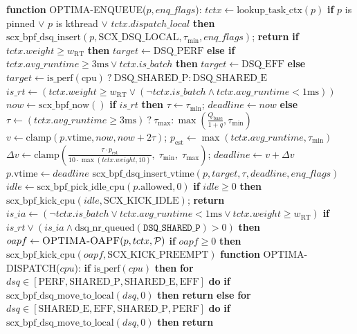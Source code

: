 \documentclass[conference]{IEEEtran}
\begin{document}
\begin{algorithm}[t]
\caption{OPTIMA-ENQUEUE \& OPTIMA-DISPATCH}
\label{alg:enqueue}\label{alg:dispatch}
\begin{algorithmic}[1]
\scriptsize\setlength{\itemsep}{0pt}
\STATE \textbf{function} \textsc{OPTIMA-ENQUEUE}($p, enq\_flags$):
\STATE \quad $tctx \leftarrow \text{lookup\_task\_ctx}(p)$
\STATE \quad \textbf{if} $p$ is pinned $\lor$ $p$ is kthread $\lor$ $tctx.dispatch\_local$ \textbf{then}
\STATE \quad \quad $\text{scx\_bpf\_dsq\_insert}(p, \text{SCX\_DSQ\_LOCAL}, \tau_{\min}, enq\_flags)$; \textbf{return}
\STATE \quad \textbf{if} $tctx.weight \ge w_{\mathrm{RT}}$ \textbf{then} $target \leftarrow \text{DSQ\_PERF}$
\STATE \quad \textbf{else if} $tctx.avg\_runtime \ge 3\text{ms} \lor tctx.is\_batch$ \textbf{then} $target \leftarrow \text{DSQ\_EFF}$
\STATE \quad \textbf{else} $target \leftarrow \text{is\_perf}(\text{cpu}) \ ? \ \text{DSQ\_SHARED\_P} : \text{DSQ\_SHARED\_E}$
\STATE \quad $is\_rt \leftarrow (tctx.weight \ge w_{\mathrm{RT}} \lor (\neg tctx.is\_batch \land tctx.avg\_runtime < 1\text{ms}))$
\STATE \quad $now \leftarrow \text{scx\_bpf\_now}()$
\STATE \quad \textbf{if} $is\_rt$ \textbf{then} $\tau \leftarrow \tau_{\min}$; $deadline \leftarrow now$
\STATE \quad \textbf{else}
\STATE \quad \quad $\tau \leftarrow (tctx.avg\_runtime \ge 3\text{ms}) \ ? \ \tau_{\max} : \max(\frac{Q_{\text{base}}}{1+q}, \tau_{\min})$
\STATE \quad \quad $v \leftarrow \mathrm{clamp}(p.\text{vtime}, now, now + 2\tau)$; $p_{\mathrm{est}} \leftarrow \max(tctx.avg\_runtime, \tau_{\min})$
\STATE \quad \quad $\Delta v \leftarrow \mathrm{clamp}\left( \frac{\tau \cdot p_{\mathrm{est}}}{10 \cdot \max(tctx.weight, 10)}, \; \tau_{\min}, \; \tau_{\max} \right)$; $deadline \leftarrow v + \Delta v$
\STATE \quad $p.\text{vtime} \leftarrow deadline$
\STATE \quad $\text{scx\_bpf\_dsq\_insert\_vtime}(p, target, \tau, deadline, enq\_flags)$
\STATE \quad $idle \leftarrow \text{scx\_bpf\_pick\_idle\_cpu}(p.\text{allowed}, 0)$
\STATE \quad \textbf{if} $idle \ge 0$ \textbf{then} $\text{scx\_bpf\_kick\_cpu}(idle, \text{SCX\_KICK\_IDLE})$; \textbf{return}
\STATE \quad $is\_ia \leftarrow (\neg tctx.is\_batch \lor tctx.avg\_runtime < 1\text{ms} \lor tctx.weight \ge w_{\mathrm{RT}})$
\STATE \quad \textbf{if} $is\_rt \lor (is\_ia \land \text{dsq\_nr\_queued}(\texttt{DSQ\_SHARED\_P}) > 0)$ \textbf{then}
\STATE \quad \quad $oapf \leftarrow \textsc{OPTIMA-OAPF}(p, tctx, \mathcal{P})$
\STATE \quad \quad \textbf{if} $oapf \ge 0$ \textbf{then} $\text{scx\_bpf\_kick\_cpu}(oapf, \text{SCX\_KICK\_PREEMPT})$
\STATE \textbf{function} \textsc{OPTIMA-DISPATCH}($cpu$):
\STATE \quad \textbf{if} $\text{is\_perf}(cpu)$ \textbf{then}
\STATE \quad \quad \textbf{for} $dsq \in [\text{PERF}, \text{SHARED\_P}, \text{SHARED\_E}, \text{EFF}]$ \textbf{do}
\STATE \quad \quad \quad \textbf{if} $\text{scx\_bpf\_dsq\_move\_to\_local}(dsq, 0)$ \textbf{then} \textbf{return}
\STATE \quad \textbf{else}
\STATE \quad \quad \textbf{for} $dsq \in [\text{SHARED\_E}, \text{EFF}, \text{SHARED\_P}, \text{PERF}]$ \textbf{do}
\STATE \quad \quad \quad \textbf{if} $\text{scx\_bpf\_dsq\_move\_to\_local}(dsq, 0)$ \textbf{then} \textbf{return}
\end{algorithmic}
\end{algorithm}
\end{document}
